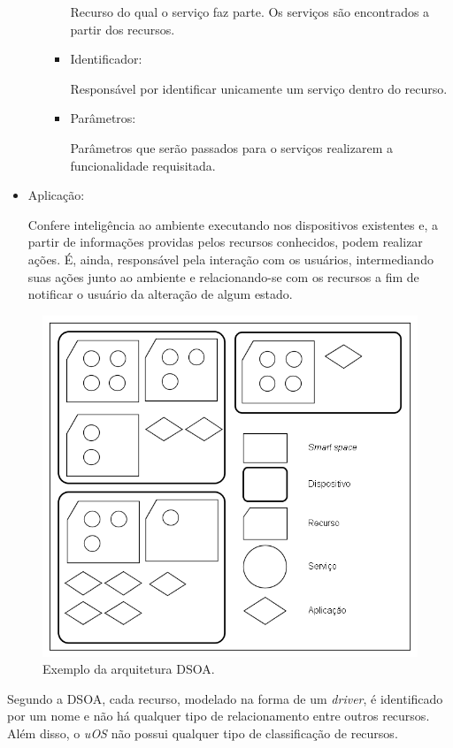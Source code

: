 \begin{itemize}
\begin{itemize}
\begin{itemize}
					Recurso do qual o serviço faz parte. Os serviços são encontrados a partir dos recursos.
				\item Identificador:

					Responsável por identificar unicamente um serviço dentro do recurso.
				\item Parâmetros:

					Parâmetros que serão passados para o serviços realizarem a funcionalidade requisitada.
			\end{itemize}
		\end{itemize}
	\item Aplicação:
	
		Confere inteligência ao ambiente executando nos dispositivos existentes e, a partir de informações providas pelos recursos conhecidos, podem realizar ações. É, ainda, responsável pela interação com os usuários, intermediando suas ações junto ao ambiente e relacionando-se com os recursos a fim de notificar o usuário da alteração de algum estado.
\end{itemize}

\begin{figure}[ht]
	\center
	\includegraphics[scale=0.6]{imagens/arquiteturaDSOA}
	\caption{Exemplo da arquitetura DSOA.}
	\label{fig:arquiteturaDSOA}
\end{figure}

Segundo a DSOA, cada recurso, modelado na forma de um \emph{driver}, é identificado por um nome e não há qualquer tipo de relacionamento entre outros recursos. Além disso, o \emph{uOS} não possui qualquer tipo de classificação de recursos. 
